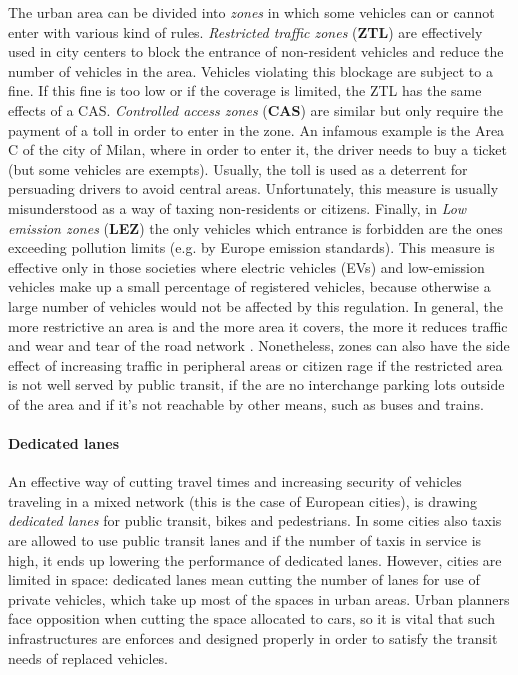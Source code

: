 The urban area can be divided into \textit{zones} in which some vehicles can or cannot enter with various kind of rules.
\textit{Restricted traffic zones} (\textbf{ZTL}) are effectively used in city centers to block the entrance of non-resident vehicles and reduce the number of vehicles in the area. Vehicles violating this blockage are subject to a fine. If this fine is too low or if the coverage is limited, the ZTL has the same effects of a CAS.
\textit{Controlled access zones} (\textbf{CAS}) are similar but only require the payment of a toll in order to enter in the zone. An infamous example is the Area C of the city of Milan, where in order to enter it, the driver needs to buy a ticket (but some vehicles are exempts). Usually, the toll is used as a deterrent for persuading drivers to avoid central areas. Unfortunately, this measure is usually misunderstood as a way of taxing non-residents or citizens.
Finally, in \textit{Low emission zones} (\textbf{LEZ}) the only vehicles which entrance is forbidden are the ones exceeding pollution limits (e.g. by Europe emission standards). This measure is effective only in those societies where electric vehicles (EVs) and low-emission vehicles make up a small percentage of registered vehicles, because otherwise a large number of vehicles would not be affected by this regulation.
In general, the more restrictive an area is and the more area it covers, the more it reduces traffic and wear and tear of the road network \cite{derobertis2016traffic}. Nonetheless, zones can also have the side effect of increasing traffic in peripheral areas or citizen rage if the restricted area is not well served by public transit, if the are no interchange parking lots outside of the area and if it's not reachable by other means, such as buses and trains.

\paragraph{Dedicated lanes}

An effective way of cutting travel times and increasing security of vehicles traveling in a mixed network (this is the case of European cities), is drawing \textit{dedicated lanes} for public transit, bikes and pedestrians. In some cities also taxis are allowed to use public transit lanes and if the number of taxis in service is high, it ends up lowering the performance of dedicated lanes. However, cities are limited in space: dedicated lanes mean cutting the number of lanes for use of private vehicles, which take up most of the spaces in urban areas. Urban planners face opposition when cutting the space allocated to cars, so it is vital that such infrastructures are enforces and designed properly in order to satisfy the transit needs of replaced vehicles.

